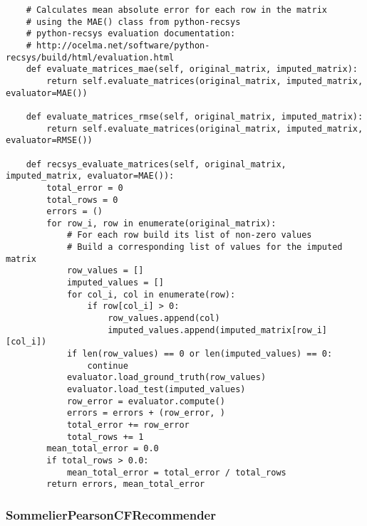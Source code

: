 \begin{verbatim}
    # Calculates mean absolute error for each row in the matrix
    # using the MAE() class from python-recsys
    # python-recsys evaluation documentation:
    # http://ocelma.net/software/python-recsys/build/html/evaluation.html
    def evaluate_matrices_mae(self, original_matrix, imputed_matrix):
        return self.evaluate_matrices(original_matrix, imputed_matrix, evaluator=MAE())
    
    def evaluate_matrices_rmse(self, original_matrix, imputed_matrix):
        return self.evaluate_matrices(original_matrix, imputed_matrix, evaluator=RMSE())

    def recsys_evaluate_matrices(self, original_matrix, imputed_matrix, evaluator=MAE()):
        total_error = 0
        total_rows = 0
        errors = ()
        for row_i, row in enumerate(original_matrix):
            # For each row build its list of non-zero values
            # Build a corresponding list of values for the imputed matrix
            row_values = []
            imputed_values = []
            for col_i, col in enumerate(row):
                if row[col_i] > 0:
                    row_values.append(col)
                    imputed_values.append(imputed_matrix[row_i][col_i])
            if len(row_values) == 0 or len(imputed_values) == 0:
                continue
            evaluator.load_ground_truth(row_values)
            evaluator.load_test(imputed_values)
            row_error = evaluator.compute()
            errors = errors + (row_error, )
            total_error += row_error
            total_rows += 1
        mean_total_error = 0.0
        if total_rows > 0.0:
            mean_total_error = total_error / total_rows
        return errors, mean_total_error
\end{verbatim}

\subsubsection{SommelierPearsonCFRecommender}

